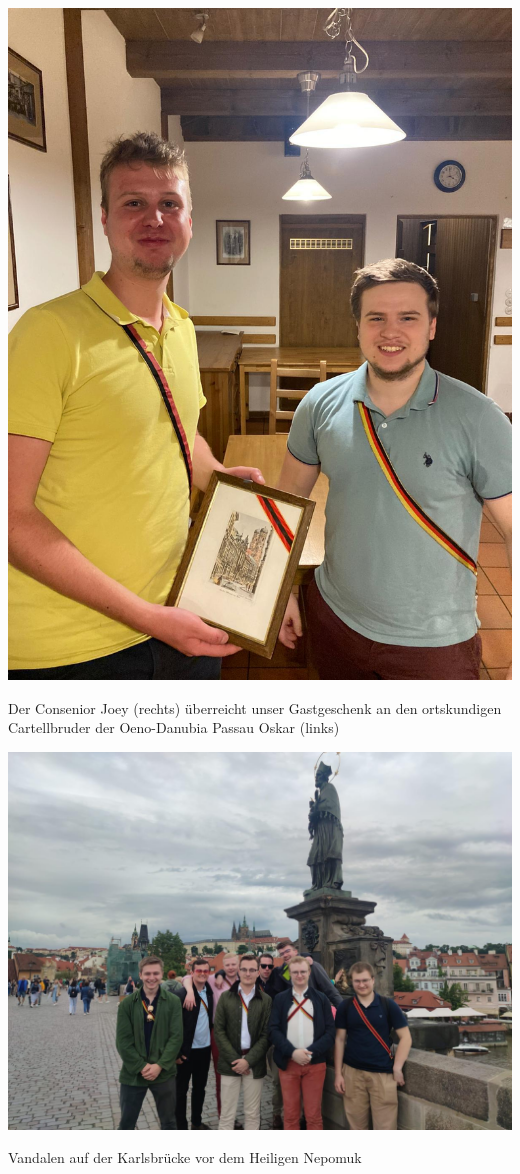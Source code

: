 \begin{center}
\begin{figurehere}
\includegraphics[width=.7\linewidth]{./Bilder/1.5BackToTheRootsAktivenfahrtPrag/6.bild.jpeg} 
  \caption{Der Consenior Joey (rechts) überreicht unser Gastgeschenk an den ortskundigen Cartellbruder der Oeno-Danubia Passau Oskar (links)}
\end{figurehere}
\end{center}

\begin{center}
\begin{figurehere}
\includegraphics[width=.7\linewidth]{./Bilder/1.5BackToTheRootsAktivenfahrtPrag/7.bild.jpeg} 
  \caption{Vandalen auf der Karlsbrücke vor dem Heiligen Nepomuk}
\end{figurehere}
\end{center}

%

